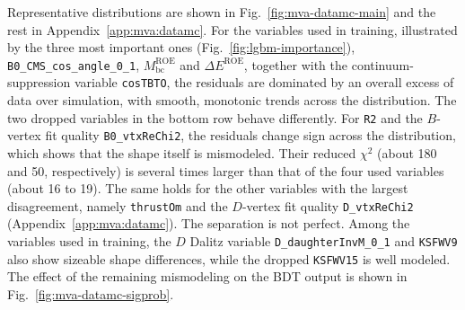Representative distributions are shown in Fig.~\ref{fig:mva-datamc-main}
and the rest in Appendix~\ref{app:mva:datamc}.
For the variables used in training, illustrated by the three most important
ones (Fig.~\ref{fig:lgbm-importance}), \texttt{B0\_CMS\_cos\_angle\_0\_1},
$M_{\mathrm{bc}}^{\mathrm{ROE}}$ and $\Delta E^{\mathrm{ROE}}$, together with
the continuum-suppression variable \texttt{cosTBTO},
the residuals are dominated by an overall excess of data over simulation,
with smooth, monotonic trends across the distribution.
The two dropped variables in the bottom row behave differently.
For \texttt{R2} and the $B$-vertex fit quality \texttt{B0\_vtxReChi2}, the
residuals change sign across the distribution, which shows that the shape
itself is mismodeled.
Their reduced $\chi^{2}$ (about 180 and 50, respectively) is several times
larger than that of the four used variables (about 16 to 19).
The same holds for the other variables with the largest disagreement, namely
\texttt{thrustOm} and the $D$-vertex fit quality \texttt{D\_vtxReChi2}
(Appendix~\ref{app:mva:datamc}).
The separation is not perfect.
Among the variables used in training, the $D$ Dalitz variable
\texttt{D\_daughterInvM\_0\_1} and \texttt{KSFWV9} also show sizeable shape
differences, while the dropped \texttt{KSFWV15} is well modeled.
The effect of the remaining mismodeling on the BDT output is shown in
Fig.~\ref{fig:mva-datamc-sigprob}.


